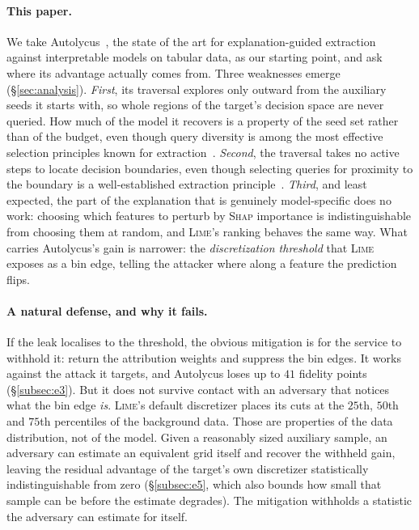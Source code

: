 \documentclass[sigconf,anonymous,review]{acmart}
\begin{document}
\paragraph{This paper.} We take Autolycus~\cite{oksuz2024autolycus}, the state of the art for explanation-guided 
extraction against interpretable models on tabular data, as our starting point,
and ask where its advantage actually comes from. Three weaknesses emerge (\S\ref{sec:analysis}).
\emph{First}, its traversal explores only outward from the auxiliary seeds it starts with, so whole
regions of the target's decision space are never queried. How much of the model it recovers is a
property of the seed set rather than of the budget, even though query diversity is among the most
effective selection principles known for extraction~\cite{pal2020activethief}. \emph{Second}, the traversal takes no active
steps to locate decision boundaries, even though selecting queries for proximity to the boundary is a
well-established extraction principle~\cite{pal2020activethief}. \emph{Third}, and least expected, the
part of the explanation that is genuinely model-specific does no work: choosing which features to
perturb by \textsc{Shap} importance is indistinguishable from choosing them at random, and
\textsc{Lime}'s ranking behaves the same way. What carries Autolycus's gain is narrower: the \emph{discretization threshold} that \textsc{Lime} exposes as a bin edge, telling the
attacker where along a feature the prediction flips.

\paragraph{A natural defense, and why it fails.} If the leak localises to the threshold, the obvious
mitigation is for the service to withhold it: return the attribution weights and suppress the bin
edges. It works against the attack it targets, and Autolycus loses up to $41$ fidelity points
(\S\ref{subsec:e3}). But it does not survive contact with an adversary that notices what the bin edge
\emph{is}. \textsc{Lime}'s default discretizer places its cuts at the $25$th, $50$th and $75$th
percentiles of the background data. Those are properties of the data distribution, not of the model.
Given a reasonably sized auxiliary sample, an adversary can estimate an equivalent grid itself and
recover the withheld gain, leaving the residual advantage of the target's own discretizer
statistically indistinguishable from zero (\S\ref{subsec:e5}, which also bounds how small that
sample can be before the estimate degrades). The mitigation withholds a statistic the adversary can
estimate for itself.
\end{document}
